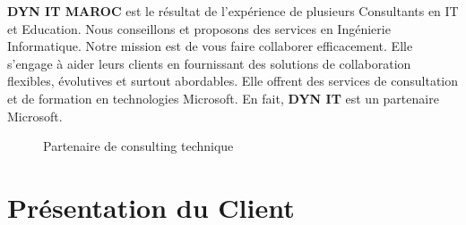 \documentclass[a4paper]{report}
\begin{document}
\begin{doublespace}
	\textbf{DYN IT MAROC} est le résultat de l’expérience de plusieurs
	Consultants en IT et Education.
	Nous conseillons et proposons des services en Ingénierie Informatique.
	Notre mission est de
	vous faire collaborer efficacement. Elle s'engage à aider leurs clients
	en fournissant des solutions de collaboration flexibles, évolutives et
	surtout abordables.
	Elle offrent des services de consultation et de formation en technologies
	Microsoft. En fait, \textbf{DYN IT} est un partenaire Microsoft.
	\begin{figure}[H]
		\begin{center}
			\caption{Partenaire de consulting technique}
		\end{center}
	\end{figure}
	\section{Présentation du Client}


\end{doublespace}
\end{document}

